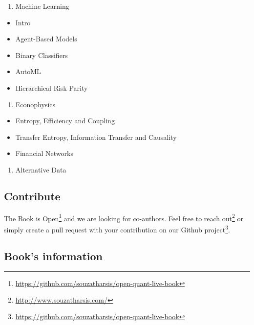 \documentclass[]{book}
\DeclareRobustCommand{\href}[2]{#2\footnote{\url{#1}}}
\providecommand{\tightlist}{%
  \setlength{\itemsep}{0pt}\setlength{\parskip}{0pt}}
\begin{document}
\begin{enumerate}
\def\labelenumi{\arabic{enumi}.}
\setcounter{enumi}{3}
\tightlist
\item
  Machine Learning
\end{enumerate}

\begin{itemize}
\tightlist
\item
  Intro
\item
  Agent-Based Models
\item
  Binary Classifiers
\item
  AutoML
\item
  Hierarchical Risk Parity
\end{itemize}

\begin{enumerate}
\def\labelenumi{\arabic{enumi}.}
\setcounter{enumi}{4}
\tightlist
\item
  Econophysics
\end{enumerate}

\begin{itemize}
\tightlist
\item
  Entropy, Efficiency and Coupling
\item
  Transfer Entropy, Information Transfer and Causality
\item
  Financial Networks
\end{itemize}

\begin{enumerate}
\def\labelenumi{\arabic{enumi}.}
\setcounter{enumi}{5}
\tightlist
\item
  Alternative Data
\end{enumerate}

\subsection*{Contribute}\label{contribute}

The Book is
\href{https://github.com/souzatharsis/open-quant-live-book}{Open} and we
are looking for co-authors. Feel free to
\href{http://www.souzatharsis.com/}{reach out} or simply create a pull
request with your contribution on our
\href{https://github.com/souzatharsis/open-quant-live-book}{Github
project}.

\subsection*{Book's information}\label{books-information}
\end{document}
